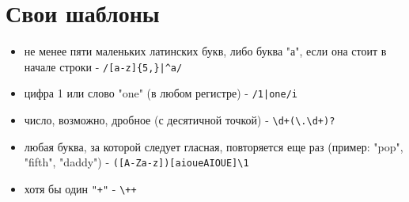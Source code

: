\documentclass[12pt, a4paper]{article}
\begin{document}
\section{Свои шаблоны}
\begin{itemize}
  \item не менее пяти маленьких латинских букв, либо буква "а", если она стоит в начале строки
    - \verb=/[a-z]{5,}|^a/=
  \item цифра 1 или слово "one" (в любом регистре) - \verb=/1|one/i=
  \item число, возможно, дробное (с десятичной точкой) - \verb|\d+(\.\d+)?|
  \item любая буква, за которой следует гласная, повторяется еще раз
    (пример: "pop", "fifth", "daddy") - \verb|([A-Za-z])[aioueAIOUE]\1|
  \item хотя бы один \verb|"+"| - \verb|\++|
\end{itemize}
\end{document}
